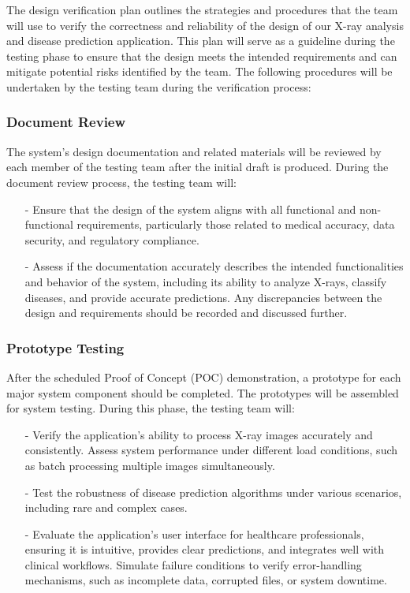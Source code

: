 \documentclass[12pt, titlepage]{article}
\begin{document}
The design verification plan outlines the strategies and procedures that the team will use to verify the correctness and reliability of the design of our X-ray analysis and disease prediction application. This plan will serve as a guideline during the testing phase to ensure that the design meets the intended requirements and can mitigate potential risks identified by the team. The following procedures will be undertaken by the testing team during the verification process:

\subsubsection{Document Review}
The system's design documentation and related materials will be reviewed by each member of the testing team after the initial draft is produced. During the document review process, the testing team will:
\begin{itemize}
\item[-] Ensure that the design of the system aligns with all functional and non-functional requirements, particularly those related to medical accuracy, data security, and regulatory compliance.
\item[-] Assess if the documentation accurately describes the intended functionalities and behavior of the system, including its ability to analyze X-rays, classify diseases, and provide accurate predictions. Any discrepancies between the design and requirements should be recorded and discussed further.
\end{itemize}

\subsubsection{Prototype Testing}
After the scheduled Proof of Concept (POC) demonstration, a prototype for each major system component should be completed. The prototypes will be assembled for system testing. During this phase, the testing team will:
\begin{itemize}
\item[-] Verify the application’s ability to process X-ray images accurately and consistently.
Assess system performance under different load conditions, such as batch processing multiple images simultaneously.
\item[-] Test the robustness of disease prediction algorithms under various scenarios, including rare and complex cases.
\item[-] Evaluate the application's user interface for healthcare professionals, ensuring it is intuitive, provides clear predictions, and integrates well with clinical workflows.
Simulate failure conditions to verify error-handling mechanisms, such as incomplete data, corrupted files, or system downtime.
\end{itemize}
\end{document}
